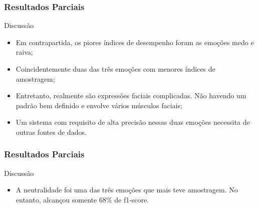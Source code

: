\documentclass{beamer}
\begin{document}
\begin{frame}
\frametitle{Resultados Parciais}
 \begin{block}{Discussão}
\begin{itemize}
\item Em contrapartida, os piores índices de desempenho foram as emoções medo e raiva;
\item Coincidentemente duas das três emoções com menores índices de amostragem;
\pause
\item Entretanto, realmente são expressões faciais complicadas. Não havendo um padrão bem definido e envolve vários músculos faciais;
\pause
\item Um sistema com requisito de alta precisão nessas duas emoções necessita de outras fontes de dados.
\end{itemize}
\end{block}
\end{frame}


\begin{frame}
\frametitle{Resultados Parciais}
 \begin{block}{Discussão}
\begin{itemize}
\pause
\item A neutralidade foi uma das três emoções que mais teve amostragem. No entanto, alcançou somente 68\% de f1-score.
\end{itemize}
\end{block}
\end{frame}
\end{document}
